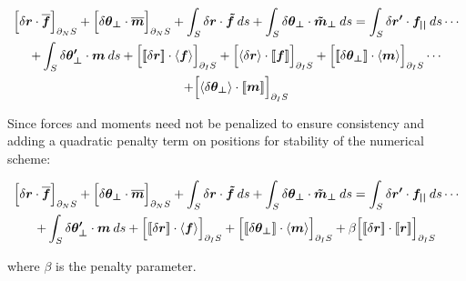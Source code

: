 \documentclass[12pt,twoside]{article}
\newcommand{\jump}[1]{\ensuremath{[\![#1]\!]} }
\begin{document}
\begin{gather}
  \Big[\delta\boldsymbol{r} \cdot \boldsymbol{\overline{f}}\Big]_{\partial_{N} S} + \Big[\delta \boldsymbol{\theta_{\perp}}\cdot\boldsymbol{\overline{m}}\Big]_{\partial_{N} S}  + \int_{S} \delta\boldsymbol{r} \cdot \boldsymbol{\tilde{f}}\:ds + \int_{S} \delta \boldsymbol{\theta_{\perp}}\cdot\boldsymbol{\tilde{m}_{\perp}}\:ds = \int_{S} \delta\boldsymbol{r^{\prime}}\cdot\boldsymbol{f_{||}}\:ds \cdots \notag \\
  + \int_{S} \delta \boldsymbol{\theta_{\perp}^{\prime}}\cdot\boldsymbol{m}\:ds + \Big[\jump{\delta\boldsymbol{r}} \cdot \langle\boldsymbol{f}\rangle\Big]_{\partial_{I} S} + \Big[\langle\delta\boldsymbol{r}\rangle \cdot \jump{\boldsymbol{f}}\Big]_{\partial_{I} S} + \Big[\jump{\delta \boldsymbol{\theta_{\perp}}}\cdot\langle\boldsymbol{m}\rangle\Big]_{\partial_{I} S} \cdots \notag \\
  + \Big[\langle\delta \boldsymbol{\theta_{\perp}}\rangle\cdot\jump{\boldsymbol{m}}\Big]_{\partial_{I} S}
\end{gather}

\noindent
Since forces and moments need not be penalized to ensure consistency and adding a quadratic penalty term on positions for stability of the numerical scheme:

\begin{gather}
  \Big[\delta\boldsymbol{r} \cdot \boldsymbol{\overline{f}}\Big]_{\partial_{N} S} + \Big[\delta \boldsymbol{\theta_{\perp}}\cdot\boldsymbol{\overline{m}}\Big]_{\partial_{N} S}  + \int_{S} \delta\boldsymbol{r} \cdot \boldsymbol{\tilde{f}}\:ds + \int_{S} \delta \boldsymbol{\theta_{\perp}}\cdot\boldsymbol{\tilde{m}_{\perp}}\:ds = \int_{S} \delta\boldsymbol{r^{\prime}}\cdot\boldsymbol{f_{||}}\:ds \cdots \notag \\
  + \int_{S} \delta \boldsymbol{\theta_{\perp}^{\prime}}\cdot\boldsymbol{m}\:ds + \Big[\jump{\delta\boldsymbol{r}} \cdot \langle\boldsymbol{f}\rangle\Big]_{\partial_{I} S} + \Big[\jump{\delta \boldsymbol{\theta_{\perp}}}\cdot\langle\boldsymbol{m}\rangle\Big]_{\partial_{I} S} + \beta\Big[\jump{\delta\boldsymbol{r}}\cdot\jump{\boldsymbol{r}}\Big]_{\partial_{I} S}
\end{gather}

\noindent
where $\beta$ is the penalty parameter.
\end{document}
